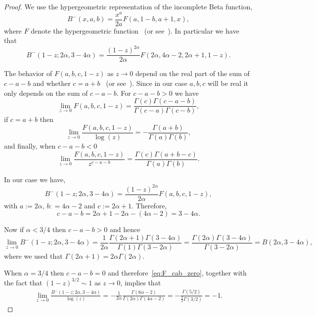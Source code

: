 \begin{appendices}
\begin{proof}
We use the hypergeometric representation of the incomplete Beta function,
\[
	B^-(x, a, b) = \frac{x^a}{2a}F(a, 1-b,a+1,x),
\]
where $F$ denote the hypergeometric function~\cite{temme2011special} (or see~\cite[Section 8.17 (ii)]{dlmf2019digital}). In particular we have that
\[
	B^-(1-z; 2\alpha, 3-4\alpha ) = \frac{(1-z)^{2\alpha}}{2\alpha} F(2\alpha,4\alpha-2,2\alpha+1,1-z).
\]

The behavior of $F(a,b,c,1-z)$ as $z \to 0$ depend on the real part of the sum of $c - a - b$ and whether $c = a + b$~\cite{andrews2000special} (or see~\cite[Section 15.4(ii)]{dlmf2019digital}). Since in our case $a,b,c$ will be real it only depends on the sum of $c - a - b$. For $c - a - b > 0$ we have
\begin{equation}\label{eq:F_cab_less_than_zero}
	\lim_{z \to 0} F(a,b,c,1-z) = \frac{\Gamma(c)\Gamma(c-a-b)}{\Gamma(c-a)\Gamma(c-b)},
\end{equation}
if $c = a + b$ then
\begin{equation}\label{eq:F_cab_zero}
	\lim_{z \to 0} \frac{F(a,b,c,1-z)}{\log(z)} = -\frac{\Gamma(a+b)}{\Gamma(a)\Gamma(b)},
\end{equation}
and finally, when $c - a - b < 0$
\begin{equation}\label{eq:F_cab_greater_than_zero}
	\lim_{z \to 0} \frac{F(a,b,c,1-z)}{z^{c - a - b}} = \frac{\Gamma(c)\Gamma(a + b -c)}{\Gamma(a)\Gamma(b)}.
\end{equation}

In our case we have,
\[
	B^-(1-z; 2\alpha, 3-4\alpha ) = \frac{(1-z)^{2\alpha}}{2\alpha} F(a,b,c,1-z),
\]
with $a := 2\alpha$, $b: = 4\alpha-2$ and $c := 2\alpha + 1$. Therefore,
\[
	c - a - b = 2\alpha + 1 - 2\alpha -(4\alpha - 2) = 3 - 4\alpha.
\]

Now if $\alpha < 3/4$ then $c - a - b > 0$ and hence
\[
	\lim_{z \to 0} B^-(1-z; 2\alpha, 3-4\alpha ) = \frac{1}{2\alpha} \frac{\Gamma(2\alpha + 1)\Gamma(3 - 4\alpha)}{\Gamma(1)\Gamma(3-2\alpha)} = \frac{\Gamma(2\alpha)\Gamma(3 - 4\alpha)}{\Gamma(3-2\alpha)}
	= B(2\alpha, 3 - 4\alpha),
\]
where we used that $\Gamma(2\alpha + 1) = 2\alpha \Gamma(2\alpha)$.

When $\alpha =3/4$ then $c - a - b = 0$ and therefore~\eqref{eq:F_cab_zero}, together with the fact that $(1-z)^{3/2} \sim 1$ as $z \to 0$, implies that
\begin{align*}
	\lim_{z \to 0} \frac{B^-(1-z; 2\alpha, 3-4\alpha )}{\log(z)} 
	= -\frac{1}{2\alpha} \frac{\Gamma(6\alpha - 2)}{\Gamma(2\alpha)\Gamma(4\alpha - 2)}
	= - \frac{\Gamma(5/2)}{\frac{3}{2}\Gamma(3/2)} = -1.
\end{align*}


\end{proof}
\end{appendices}
